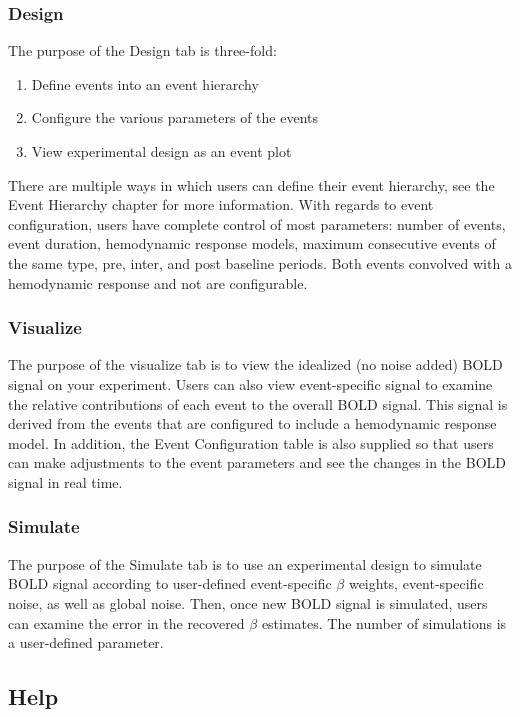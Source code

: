 \documentclass[10pt]{article}
\begin{document}
		\subsubsection*{Design}
		\label{subsubsec:design}
			The purpose of the Design tab is three-fold:
			\begin{enumerate}
				\item Define events into an event hierarchy
				\item Configure the various parameters of the events
				\item View experimental design as an event plot
			\end{enumerate}

			There are multiple ways in which users can define their event hierarchy, see the Event Hierarchy chapter for more information.
			With regards to event configuration, users have complete control of most parameters: number of events, event duration, hemodynamic response models, maximum consecutive events of the same type, pre, inter, and post baseline periods.
			Both events convolved with a hemodynamic response and not are configurable.

		\subsubsection*{Visualize}
		\label{subsubsec:visualize}
			The purpose of the visualize tab is to view the idealized (no noise added) BOLD signal on your experiment.
			Users can also view event-specific signal to examine the relative contributions of each event to the overall BOLD signal.
			This signal is derived from the events that are configured to include a hemodynamic response model.
			In addition, the Event Configuration table is also supplied so that users can make adjustments to the event parameters and see the changes in the BOLD signal in real time.

		\subsubsection*{Simulate}
		\label{subsubsec:simulate}
			The purpose of the Simulate tab is to use an experimental design to simulate BOLD signal according to user-defined event-specific $\beta$ weights, event-specific noise, as well as global noise.
			Then, once new BOLD signal is simulated, users can examine the error in the recovered $\beta$ estimates.
			The number of simulations is a user-defined parameter.

	\subsection*{Help}
	\label{subsec:help}
\end{document}
